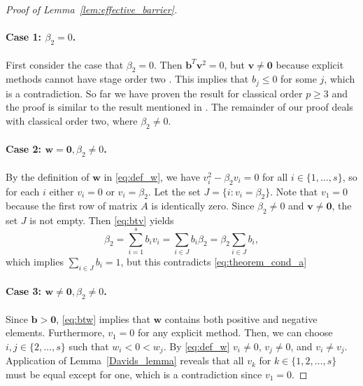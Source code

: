 \begin{proof}[Proof of Lemma~\ref{lem:effective_barrier}]
	\paragraph{Case 1: $\beta_2 = 0$.}
	First consider the case that $\beta_2 = 0$. 
	Then $\bm{b}^T\bm{v}^2 = 0$, but $\bm{v }\neq \bm{0}$ because explicit methods
	cannot have stage order two \cite{Ruuth2002}. This implies that $b_j \leq 0$ 
	for some $j$, which is a contradiction.
	So far we have proven the result for classical order $p \ge 3$ 
	and the proof is similar to the result mentioned in \cite{Ruuth2002}. 
	The remainder of our proof deals with classical order two, 
	where $\beta_2 \neq 0$.

	\paragraph{Case 2: $\bm{w} = \bm{0}, \beta_2\ne0$.}
	By the definition of $\bm{w}$ in \eqref{eq:def_w}, we have $v_i^2 - \beta_2 v_i = 0$ 
	for all $i \in \{1, \dots, s\}$, 	so for each $i$ either $v_i = 0$ or $v_i = \beta_2$.
	Let the set $J = \{i : v_i = \beta_2\}$. 
	Note that $v_1 = 0$ because the first row of matrix $A$ is identically zero.
	Since $\beta_2 \neq 0$ and $ \bm{v} \neq \bm{0}$, the set $J$ is not empty.
	Then \eqref{eq:btv} yields 
	\begin{equation*}
            \beta_2 = \sum_{i=1}^s b_i v_i = \sum_{i \in J}b_i\beta_2 = \beta_2\sum_{i \in J}b_i,
	\end{equation*}
        which implies $\sum_{i\in J} b_i = 1$, but this contradicts \eqref{eq:theorem_cond_a}

	\paragraph{Case 3: $\bm{w} \neq \bm{0}, \beta_2\ne0$.}
	Since $\bm{b} > \bm{0}$, \eqref{eq:btw} implies that $\bm{w}$ contains both positive 
	and negative elements. 
	Furthermore, $v_1=0$ for any explicit method.
	Then, we can choose $i, j \in \{2, \dots, s\}$ such that $w_i < 0 < w_j$.
     By \eqref{eq:def_w} $v_i\ne 0$, $v_j\ne 0$, and $v_i\ne v_j$. 
     Application of Lemma~\ref{Davids_lemma} reveals that all $v_k$ for 
     $k \in\{1,2,\dots,s\}$ must be equal except for one, which is a contradiction
     since $v_1 = 0$.

\end{proof}

